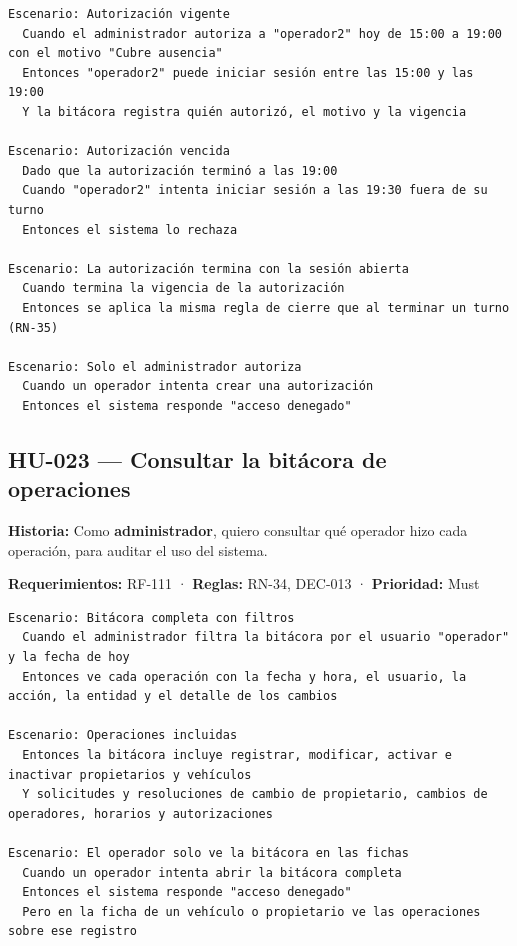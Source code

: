 \begin{lstlisting}[style=gherkin]
Escenario: Autorización vigente
  Cuando el administrador autoriza a "operador2" hoy de 15:00 a 19:00 con el motivo "Cubre ausencia"
  Entonces "operador2" puede iniciar sesión entre las 15:00 y las 19:00
  Y la bitácora registra quién autorizó, el motivo y la vigencia

Escenario: Autorización vencida
  Dado que la autorización terminó a las 19:00
  Cuando "operador2" intenta iniciar sesión a las 19:30 fuera de su turno
  Entonces el sistema lo rechaza

Escenario: La autorización termina con la sesión abierta
  Cuando termina la vigencia de la autorización
  Entonces se aplica la misma regla de cierre que al terminar un turno (RN-35)

Escenario: Solo el administrador autoriza
  Cuando un operador intenta crear una autorización
  Entonces el sistema responde "acceso denegado"
\end{lstlisting}

\subsection{HU-023 — Consultar la bitácora de operaciones}

\textbf{Historia:} Como \textbf{administrador}, quiero consultar qué operador hizo cada operación, para auditar el uso del sistema.


\textbf{Requerimientos:} RF-111 · \textbf{Reglas:} RN-34, DEC-013 · \textbf{Prioridad:} Must


\begin{lstlisting}[style=gherkin]
Escenario: Bitácora completa con filtros
  Cuando el administrador filtra la bitácora por el usuario "operador" y la fecha de hoy
  Entonces ve cada operación con la fecha y hora, el usuario, la acción, la entidad y el detalle de los cambios

Escenario: Operaciones incluidas
  Entonces la bitácora incluye registrar, modificar, activar e inactivar propietarios y vehículos
  Y solicitudes y resoluciones de cambio de propietario, cambios de operadores, horarios y autorizaciones

Escenario: El operador solo ve la bitácora en las fichas
  Cuando un operador intenta abrir la bitácora completa
  Entonces el sistema responde "acceso denegado"
  Pero en la ficha de un vehículo o propietario ve las operaciones sobre ese registro
\end{lstlisting}



